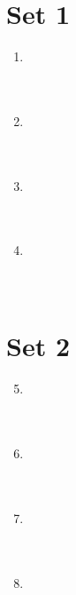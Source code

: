 \documentclass[11pt]{article}
\begin{document}
\newcommand{\sevenpoints}{}
\newcommand{\righthead}{\fdbox{Round}{Practice Guts}\fdbox{Team Number}{\phantom{00}}}

\section*{Set 1}

\begin{multicols*}{1}
 \begin{enumerate} 
\setcounter{enumi}{0}

\item \underline{\phantom{000000000000000}} \\ \\ \\
\item \underline{\phantom{000000000000000}} \\ \\ \\
\item \underline{\phantom{000000000000000}} \\ \\ \\
\item \underline{\phantom{000000000000000}} \\ \\ \\

\end{enumerate} \end{multicols*}

\eject

\section*{Set 2}

\begin{multicols*}{1} \begin{enumerate} 
\setcounter{enumi}{4}

\item \underline{\phantom{000000000000000}} \\ \\ \\
\item \underline{\phantom{000000000000000}} \\ \\ \\
\item \underline{\phantom{000000000000000}} \\ \\ \\
\item \underline{\phantom{000000000000000}} \\ \\ \\

\end{enumerate} \end{multicols*}
\end{document}
